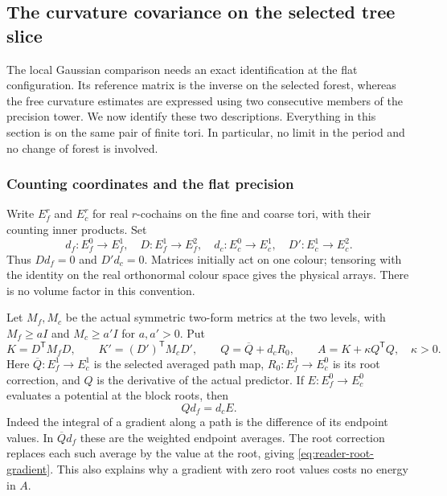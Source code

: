 \subsection{The curvature covariance on the selected tree slice}
\label{sec:actual-reader-tree-covariance}

The local Gaussian comparison needs an exact identification at the flat
configuration. Its reference matrix is the inverse on the selected forest,
whereas the free curvature estimates are expressed using two consecutive
members of the precision tower. We now identify these two descriptions.
Everything in this section is on the same pair of finite tori. In
particular, no limit in the period and no change of forest is involved.

\subsubsection{Counting coordinates and the flat precision}

Write $E_f^r$ and $E_c^r$ for real $r$-cochains on the fine and coarse
tori, with their counting inner products. Set
\[
 d_f:E_f^0\longrightarrow E_f^1,\quad
 D:E_f^1\longrightarrow E_f^2,\quad
 d_c:E_c^0\longrightarrow E_c^1,\quad
 D':E_c^1\longrightarrow E_c^2.
\]
Thus $Dd_f=0$ and $D'd_c=0$. Matrices initially act on one colour;
tensoring with the identity on the real orthonormal colour space gives
the physical arrays. There is no volume factor in this convention.

Let $M_f,M_c$ be the actual symmetric two-form metrics at the two levels,
with $M_f\ge aI$ and $M_c\ge a'I$ for $a,a'>0$. Put
\[
 K=D^{\mathsf T}M_fD,\qquad
 K'=(D')^{\mathsf T}M_cD',\qquad
 Q=\overline Q+d_cR_0,\qquad
 A=K+\kappa Q^{\mathsf T}Q,\quad \kappa>0.
\]
Here $\overline Q:E_f^1\to E_c^1$ is the selected averaged path
map, $R_0:E_f^1\to E_c^0$ is its root correction, and $Q$ is the
derivative of the actual predictor. If $E:E_f^0\to E_c^0$ evaluates
a potential at the block roots, then
\begin{equation}\label{eq:reader-root-gradient}
 Qd_f=d_cE.
\end{equation}
Indeed the integral of a gradient along a path is the difference of
its endpoint values. In $\overline Qd_f$ these are the weighted
endpoint averages. The root correction replaces each such average by
the value at the root, giving \eqref{eq:reader-root-gradient}.
This also explains why a gradient with zero root values costs no
energy in $A$.

